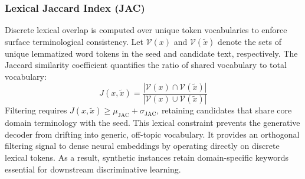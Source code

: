 \documentclass{ieeeaccess}
\begin{document}
\subsubsection{Lexical Jaccard Index (JAC)}
Discrete lexical overlap is computed over unique token vocabularies to enforce surface terminological consistency. Let $\mathcal{V}(x)$ and $\mathcal{V}(\tilde{x})$ denote the sets of unique lemmatized word tokens in the seed and candidate text, respectively. The Jaccard similarity coefficient quantifies the ratio of shared vocabulary to total vocabulary:
\begin{equation}
    J(x, \tilde{x}) = \frac{|\mathcal{V}(x) \cap \mathcal{V}(\tilde{x})|}{|\mathcal{V}(x) \cup \mathcal{V}(\tilde{x})|}
\end{equation}
Filtering requires $J(x, \tilde{x}) \ge \mu_{\text{JAC}} + \sigma_{\text{JAC}}$, retaining candidates that share core domain terminology with the seed. This lexical constraint prevents the generative decoder from drifting into generic, off-topic vocabulary. It provides an orthogonal filtering signal to dense neural embeddings by operating directly on discrete lexical tokens. As a result, synthetic instances retain domain-specific keywords essential for downstream discriminative learning.
\end{document}
